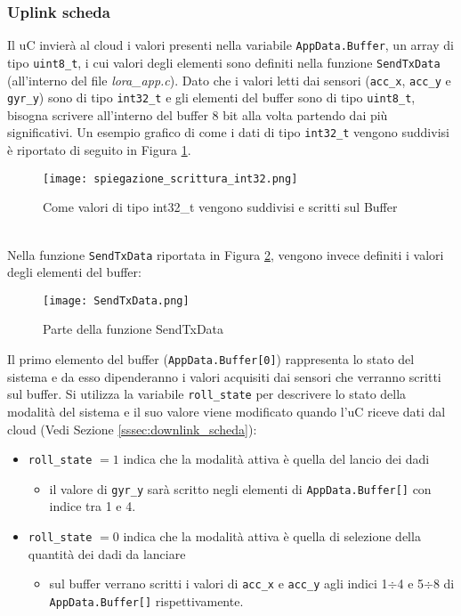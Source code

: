   \subsubsection{Uplink scheda}\label{sssec:uplink_scheda}
  Il uC invierà al cloud i valori presenti nella variabile \Verb|AppData.Buffer|, un array di tipo \Verb|uint8_t|, i cui valori degli elementi sono definiti nella funzione \Verb|SendTxData| (all'interno del file \textit{lora\_app.c}).
  Dato che i valori letti dai sensori (\Verb|acc_x|, \Verb|acc_y| e \Verb|gyr_y|) sono di tipo \Verb|int32_t| e gli elementi del buffer sono di tipo \Verb|uint8_t|, bisogna scrivere all'interno del buffer 8 bit alla volta partendo dai più significativi. Un esempio grafico di come i dati di tipo \Verb|int32_t| vengono suddivisi è riportato di seguito in Figura \ref{fig:int32tobuffer}.
  \begin{figure}[h!]
    \centering
    \texttt{[image: spiegazione\_scrittura\_int32.png]}
    \caption{Come valori di tipo int32\_t vengono suddivisi e scritti sul Buffer}
    \label{fig:int32tobuffer}
  \end{figure}
  \\Nella funzione \Verb|SendTxData| riportata in Figura \ref{fig:sendtxdata}, vengono invece definiti i valori degli elementi del buffer:
  \begin{figure}[H]
    \centering
    \texttt{[image: SendTxData.png]}
    \caption{Parte della funzione SendTxData}
    \label{fig:sendtxdata}
  \end{figure}
  Il primo elemento del buffer (\Verb|AppData.Buffer[0]|) rappresenta lo stato del sistema e da esso dipenderanno i valori acquisiti dai sensori che verranno scritti sul buffer.
  Si utilizza la variabile \Verb|roll_state| per descrivere lo stato della modalità del sistema e il suo valore viene modificato quando l'uC riceve dati dal cloud (Vedi Sezione \ref{sssec:downlink_scheda}):
  \begin{itemize}
    \item \Verb|roll_state| $=1$ indica che la modalità attiva è quella del lancio dei dadi
          \begin{itemize}
            \item il valore di \Verb|gyr_y| sarà scritto negli elementi di \Verb|AppData.Buffer[]| con indice tra 1 e 4.
          \end{itemize}
    \item \Verb|roll_state| $=0$ indica che la modalità attiva è quella di selezione della quantità dei dadi da lanciare
          \begin{itemize}
            \item sul buffer verrano scritti i valori di \Verb|acc_x| e \Verb|acc_y| agli indici 1$\div$4 e 5$\div$8 di \Verb|AppData.Buffer[]| rispettivamente.
          \end{itemize}
  \end{itemize}
\newpage
